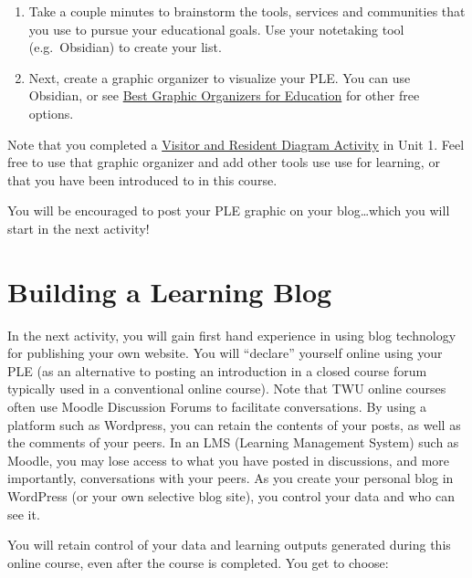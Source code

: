 \documentclass[
]{book}
\providecommand{\tightlist}{%
  \setlength{\itemsep}{0pt}\setlength{\parskip}{0pt}}
\theoremstyle{definition}
\theoremstyle{definition}
\theoremstyle{definition}
\theoremstyle{definition}
\theoremstyle{remark}
\begin{document}
\begin{reflect}
\begin{enumerate}
\def\labelenumi{\arabic{enumi}.}
\tightlist
\item
  Take a couple minutes to brainstorm the tools, services and communities that you use to pursue your educational goals. Use your notetaking tool (e.g.~Obsidian) to create your list.
\item
  Next, create a graphic organizer to visualize your PLE. You can use Obsidian, or see \href{https://www.techlearning.com/news/best-graphic-organizers-for-education}{Best Graphic Organizers for Education} for other free options.
\end{enumerate}

Note that you completed a \href{https://twu-innovation.github.io/inno101/introduction-to-digital-literacies-for-online-learning.html\#activity-visitor-and-resident-diagram}{Visitor and Resident Diagram Activity} in Unit 1. Feel free to use that graphic organizer and add other tools use use for learning, or that you have been introduced to in this course.

You will be encouraged to post your PLE graphic on your blog\ldots which you will start in the next activity!
\end{reflect}

\hypertarget{building-a-learning-blog}{%
\section{Building a Learning Blog}\label{building-a-learning-blog}}

In the next activity, you will gain first hand experience in using blog technology for publishing your own website. You will ``declare'' yourself online using your PLE (as an alternative to posting an introduction in a closed course forum typically used in a conventional online course). Note that TWU online courses often use Moodle Discussion Forums to facilitate conversations. By using a platform such as Wordpress, you can retain the contents of your posts, as well as the comments of your peers. In an LMS (Learning Management System) such as Moodle, you may lose access to what you have posted in discussions, and more importantly, conversations with your peers. As you create your personal blog in WordPress (or your own selective blog site), you control your data and who can see it.

You will retain control of your data and learning outputs generated during this online course, even after the course is completed.
You get to choose:
\end{document}
